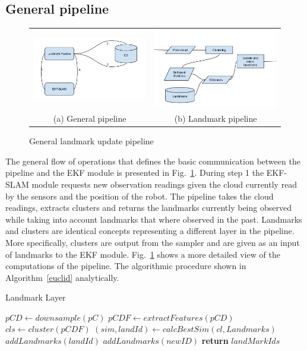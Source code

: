 \documentclass[twoside,hidelinks]{article}
\begin{document}
\subsection{General pipeline}

\begin{figure}
\begin{tabular}{cc}
  \includegraphics[width=.33\textwidth]{workflowGen} &    \includegraphics[width=.33\textwidth]{workflowSpec} \\
(a) General pipeline & (b) Landmark pipeline \\[6pt]
\end{tabular}
\caption{General landmark update pipeline}
\label{pipeline}
\end{figure}


The general flow of operations that defines the basic communication between the pipeline and the EKF module is presented in Fig.~\ref{pipeline}. During step 1 the EKF-SLAM module requests new observation readings given the cloud currently read by the sensors and the position of the robot. The pipeline takes the cloud readings, extracts clusters and returns the landmarks currently being observed while taking into account landmarks that where observed in the past. Landmarks and clusters are identical concepts representing a different layer in the pipeline. More specifically, clusters are output from the sampler and are given as an input of landmarks to the EKF module. Fig.~\ref{pipeline} shows a more detailed view of the computations of the pipeline. The algorithmic procedure shown in Algorithm~\ref{euclid} analytically.


\begin{algorithm}
  \caption{Landmark Layer}\label{euclid}
  \begin{algorithmic}[1]
      \State $pCD \gets downsample(pC)$ 
      \State $pCDF \gets extractFeatures(pCD)$
      \State $cls \gets cluster(pCDF)$  
	      \State $ (sim, landId) \gets calcBestSim(cl, Landmarks) $
			   \State $ addLandmarks(landId)$
			\Else 
			   \State $addLandmarks(newID)$
			\EndIf
      \EndFor
      \State \textbf{return} $ landMarkIds$
    \EndProcedure
  \end{algorithmic}
\end{algorithm}
\end{document}
